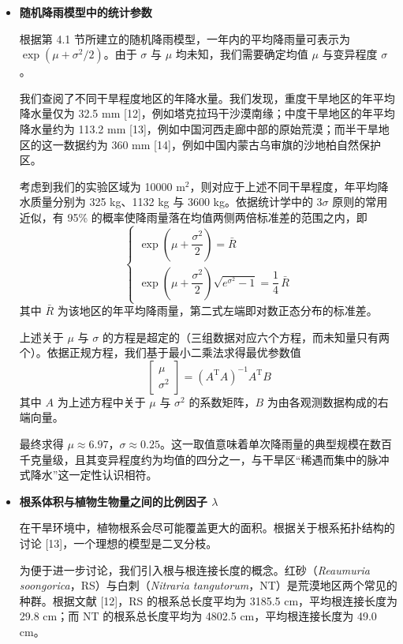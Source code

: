 \documentclass[11pt,a4paper]{ctexart}
\begin{document}
\begin{itemize}
\item \textbf{随机降雨模型中的统计参数}

根据第 4.1 节所建立的随机降雨模型，一年内的平均降雨量可表示为 $\exp\left(\mu+\sigma^{2}/2\right)$。由于 $\sigma$ 与 $\mu$ 均未知，我们需要确定均值 $\mu$ 与变异程度 $\sigma$。

我们查阅了不同干旱程度地区的年降水量。我们发现，重度干旱地区的年平均降水量仅为 32.5 mm [12]，例如塔克拉玛干沙漠南缘；中度干旱地区的年平均降水量约为 113.2 mm [13]，例如中国河西走廊中部的原始荒漠；而半干旱地区的这一数据约为 360 mm [14]，例如中国内蒙古乌审旗的沙地柏自然保护区。

考虑到我们的实验区域为 10000 $\mathrm{m^{2}}$，则对应于上述不同干旱程度，年平均降水质量分别为 325 kg、1132 kg 与 3600 kg。依据统计学中的 $3\sigma$ 原则的常用近似，有 95\% 的概率使降雨量落在均值两侧两倍标准差的范围之内，即
\[
\begin{cases}
\exp\left(\mu+\dfrac{\sigma^{2}}{2}\right)=\bar R\\[1.0em]
\exp\left(\mu+\dfrac{\sigma^{2}}{2}\right)\sqrt{e^{\sigma^{2}}-1}=\dfrac{1}{4}\,\bar R
\end{cases}
\]
其中 $\bar R$ 为该地区的年平均降雨量，第二式左端即对数正态分布的标准差。

上述关于 $\mu$ 与 $\sigma$ 的方程是超定的（三组数据对应六个方程，而未知量只有两个）。依据正规方程，我们基于最小二乘法求得最优参数值
\[
\begin{bmatrix}\mu\\[0.3em] \sigma^{2}\end{bmatrix}=\left(A^{\mathrm{T}}A\right)^{-1}A^{\mathrm{T}}B
\]
其中 $A$ 为上述方程中关于 $\mu$ 与 $\sigma^{2}$ 的系数矩阵，$B$ 为由各观测数据构成的右端向量。

最终求得 $\mu\approx 6.97$，$\sigma\approx 0.25$。这一取值意味着单次降雨量的典型规模在数百千克量级，且其变异程度约为均值的四分之一，与干旱区“稀遇而集中的脉冲式降水”这一定性认识相符。

\item \textbf{根系体积与植物生物量之间的比例因子 $\lambda$}

在干旱环境中，植物根系会尽可能覆盖更大的面积。根据关于根系拓扑结构的讨论 [13]，一个理想的模型是二叉分枝。

为便于进一步讨论，我们引入根与根连接长度的概念。红砂（\textit{Reaumuria soongorica}，RS）与白刺（\textit{Nitraria tangutorum}，NT）是荒漠地区两个常见的种群。根据文献 [12]，RS 的根系总长度平均为 3185.5 cm，平均根连接长度为 29.8 cm；而 NT 的根系总长度平均为 4802.5 cm，平均根连接长度为 49.0 cm。


\end{itemize}
\end{document}
